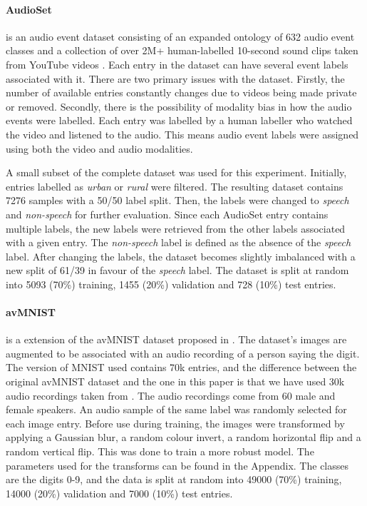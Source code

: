 \label{sec:datasets}

\paragraph{\textbf{AudioSet}} is an audio event dataset consisting of an expanded ontology of 632 audio event classes and a collection of over 2M+ human-labelled 10-second sound clips taken from YouTube videos \cite{audioset}. Each entry in the dataset can have several event labels associated with it. There are two primary issues with the dataset. Firstly, the number of available entries constantly changes due to videos being made private or removed. Secondly, there is the possibility of modality bias \cite{tvqa} in how the audio events were labelled. Each entry was labelled by a human labeller who watched the video and listened to the audio. This means audio event labels were assigned using both the video and audio modalities.

A small subset of the complete dataset was used for this experiment. Initially, entries labelled as \textit{urban} or \textit{rural} were filtered. The resulting dataset contains 7276 samples with a 50/50 label split. Then, the labels were changed to \textit{speech} and \textit{non-speech} for further evaluation. Since each AudioSet entry contains multiple labels, the new labels were retrieved from the other labels associated with a given entry. The \textit{non-speech} label is defined as the absence of the \textit{speech} label. After changing the labels, the dataset becomes slightly imbalanced with a new split of 61/39 in favour of the \textit{speech} label. The dataset is split at random into 5093 (70\%) training, 1455 (20\%) validation and 728 (10\%) test entries.


\paragraph{\textbf{avMNIST}} is a extension of the avMNIST dataset proposed in \cite{vielzeuf2018centralnet}. The dataset's images are augmented to be associated with an audio recording of a person saying the digit. The version of MNIST used contains 70k entries, and the difference between the original avMNIST dataset and the one in this paper is that we have used 30k audio recordings taken from \cite{becker2018interpreting}. The audio recordings come from 60 male and female speakers. An audio sample of the same label was randomly selected for each image entry. Before use during training, the images were transformed by applying a Gaussian blur, a random colour invert, a random horizontal flip and a random vertical flip. This was done to train a more robust model. The parameters used for the transforms can be found in the Appendix. The classes are the digits 0-9, and the data is split at random into 49000 (70\%) training, 14000 (20\%) validation and 7000 (10\%) test entries.

